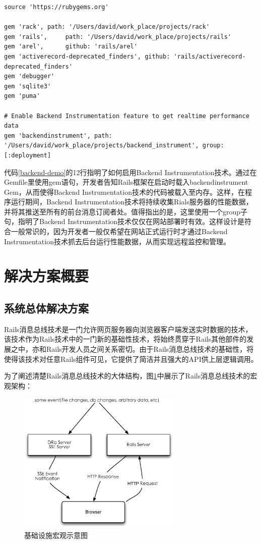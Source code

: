 \begin{lstlisting}[caption={启用Auto-Realod技术}, label=backend-demo]
source 'https://rubygems.org'

gem 'rack', path: '/Users/david/work_place/projects/rack'
gem 'rails',     path: '/Users/david/work_place/projects/rails'
gem 'arel',      github: 'rails/arel'
gem 'activerecord-deprecated_finders', github: 'rails/activerecord-deprecated_finders'
gem 'debugger'
gem 'sqlite3'
gem 'puma'

# Enable Backend Instrumentation feature to get realtime performance data
gem 'backendinstrument', path: '/Users/david/work_place/projects/backend_instrument', group: [:deployment]

\end{lstlisting}

代码\ref{backend-demo}的12行指明了如何启用Backend Instrumentation技术。通过在Gemfile里使用gem语句，开发者告知Rails框架在启动时载入backendinstrument Gem，从而使得Backend Instrumentation技术的代码被载入至内存。这样，在程序运行期间，Backend Instrumentation技术将持续收集Rials服务器的性能数据，并将其推送至所有的前台消息订阅者处。值得指出的是，这里使用一个group子句，指明了Backend Instrumentation技术仅仅在网站部署时有效。这样设计是符合一般常识的，因为开发者一般仅希望在网站正式运行时才通过Backend Instrumentation技术抓去后台运行性能数据，从而实现远程监控和管理。

\section{解决方案概要}
\subsection{系统总体解决方案}
Rails消息总线技术是一门允许网页服务器向浏览器客户端发送实时数据的技术，该技术作为Rails技术中的一门新的基础性技术，将始终贯穿于Rails其他部件的发展之中，亦和Rails开发人员之间关系密切。由于Rails消息总线技术的基础性，将使得该技术对任意Rails组件可见，它提供了简洁并且强大的API供上层逻辑调用。

为了阐述清楚Rails消息总线技术的大体结构，图\ref{fig-infra}中展示了Rails消息总线技术的宏观架构：

\begin{figure}[h]
\centering
\includegraphics[width=0.7\textwidth]{images/overview/infrastructure.eps}
\caption{基础设施宏观示意图}
\label{fig-infra}
\end{figure}

